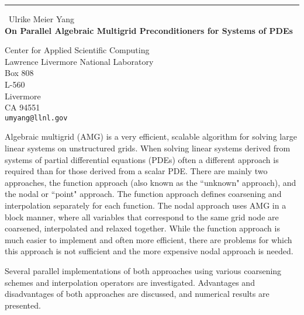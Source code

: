 \documentclass{report}
\begin{document}
\begin{center}
\rule{6in}{1pt} \
{\large Ulrike Meier Yang \\
{\bf On Parallel Algebraic Multigrid Preconditioners for Systems of PDEs}}

Center for Applied Scientific Computing \\ Lawrence Livermore National Laboratory \\ Box 808 \\ L-560 \\ Livermore \\ CA 94551
\\
{\tt umyang@llnl.gov}\end{center}

Algebraic multigrid (AMG) is a very efficient, scalable algorithm for
solving large linear systems on unstructured grids.
When solving linear systems derived from systems of partial differential
equations (PDEs) often a different approach is
required than for those derived from a scalar PDE.
There are mainly two approaches, the function approach (also known
as the ``unknown" approach), and the nodal or ``point" approach.
The function approach defines coarsening and interpolation separately for
each function. The nodal approach uses AMG in a
block manner, where all variables that correspond to the same grid
node are coarsened, interpolated and relaxed together.
While the function approach is much easier to implement and often
more efficient, there are problems for which this approach is not
sufficient and the more expensive nodal approach is needed.

Several parallel implementations of both approaches using
various coarsening schemes and interpolation operators are investigated.
Advantages and disadvantages of both approaches are discussed,
and numerical results are presented.
\end{document}
